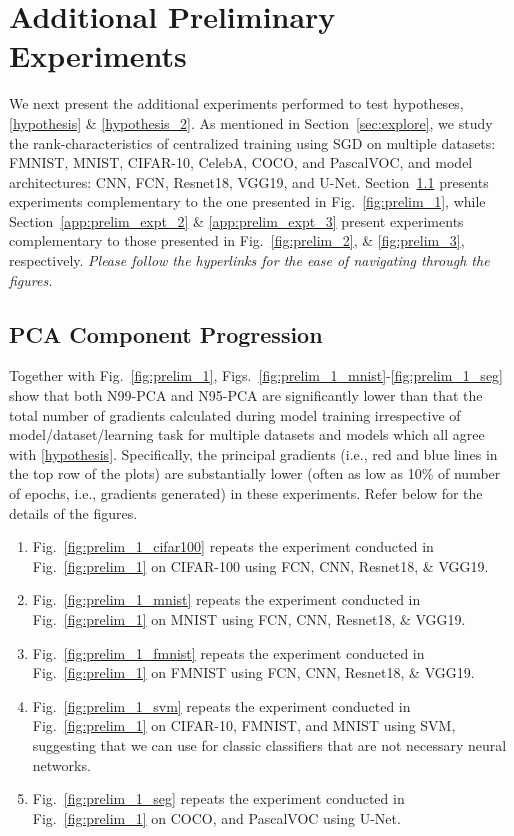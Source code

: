 \newpage
\section{Additional Preliminary Experiments}
\label{app:addl_expt}

We next present the additional experiments performed to test hypotheses, \eqref{hypothesis} \& \eqref{hypothesis_2}. As mentioned in Section~\ref{sec:explore}, we study the rank-characteristics of centralized training using SGD on multiple datasets: FMNIST, MNIST, CIFAR-10, CelebA, COCO, and PascalVOC, and model architectures: CNN, FCN, Resnet18, VGG19, and U-Net. Section~\ref{app:prelim_expt_1} presents experiments complementary to the one presented in Fig.~\ref{fig:prelim_1}, while Section~\ref{app:prelim_expt_2} \& \ref{app:prelim_expt_3} present experiments complementary to those presented in Fig.~\ref{fig:prelim_2}, \& \ref{fig:prelim_3}, respectively. \textit{Please follow the hyperlinks for the ease of navigating through the figures.}

\subsection{PCA Component Progression}
\label{app:prelim_expt_1}

Together with Fig.~\ref{fig:prelim_1}, Figs.~\ref{fig:prelim_1_mnist}-\ref{fig:prelim_1_seg} show that both N99-PCA and N95-PCA are significantly lower than that the total number of gradients calculated during model training irrespective of model/dataset/learning task for multiple datasets and models which all agree with \eqref{hypothesis}. Specifically, the principal gradients (i.e., red and blue lines in the top row of the plots) are substantially lower (often as low as 10\% of number of epochs, i.e., gradients generated) in these experiments. Refer below for the details of the figures.

\begin{enumerate}[leftmargin=5mm]
    \item Fig.~\ref{fig:prelim_1_cifar100} repeats the experiment conducted in Fig.~\ref{fig:prelim_1} on CIFAR-100 using FCN, CNN, Resnet18, \& VGG19.
    \item Fig.~\ref{fig:prelim_1_mnist} repeats the experiment conducted in Fig.~\ref{fig:prelim_1} on MNIST using FCN, CNN, Resnet18, \& VGG19.
    \item Fig.~\ref{fig:prelim_1_fmnist} repeats the experiment conducted in Fig.~\ref{fig:prelim_1} on FMNIST using FCN, CNN, Resnet18, \& VGG19.
    \item Fig.~\ref{fig:prelim_1_svm} repeats the experiment conducted in Fig.~\ref{fig:prelim_1} on CIFAR-10, FMNIST, and MNIST using SVM, suggesting that we can use {\algName} for classic classifiers that are not necessary neural networks.
    \item Fig.~\ref{fig:prelim_1_seg} repeats the experiment conducted in Fig.~\ref{fig:prelim_1} on COCO, and PascalVOC using U-Net.
\end{enumerate}



